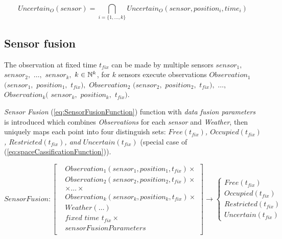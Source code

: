     \begin{equation}\label{eq:uncertainObservableSpaceForOneSensor}
         Uncertain_O(sensor)= \bigcap_{i=\{1,\dots,k\}}Uncertain_O(sensor,position_i,time_i)
    \end{equation}

\subsection{Sensor fusion}\label{s:SensorFusionDefinition}
    \noindent The observation at fixed time $t_{fix}$ can be made by multiple sensors $sensor_1,$ $sensor_2,$ $\dots,$ $sensor_k,$ $k\in\mathbb{N}^k$, for $k$ sensors execute observations $Observation_1$ $(sensor_1,$ $position_1,$ $t_{fix}),$ $Observation_2$ $(sensor_2,$ $position_2,$ $t_{fix}),$ $\dots,$ $Observation_k($ $sensor_k,$ $position_k,$ $t_{fix})$. 

    \emph{Sensor Fusion} (\ref{eq:SensorFusionFunction}) function with \emph{data fusion parameters} is introduced which combines \emph{Observations} for each \emph{sensor} and \emph{Weather}, then  uniquely maps each point into four distinguish sets: \emph{$Free(t_{fix})$, $Occupied(t_{fix})$, $Restricted(t_{fix})$, and $Uncertain(t_{fix})$} (special case of (\ref{eq:spaceCassificationFunction})).

    \begin{equation}\label{eq:SensorFusionFunction}
        SensorFusion:
        \left[
        \begin{aligned}
            &Observation_1 (sensor_1, position_1, t_{fix})\times\\
            &Observation_2 (sensor_2, position_2, t_{fix})\times\\
            &\times\dots\times\\
            &Observation_k (sensor_k, position_k, t_{fix})\times\\
            &Weather(\dots)\\
            &\textit{fixed time }t_{fix}\times\\
            &sensorFusionParameters\\
        \end{aligned}
        \right]
        \to
        \begin{cases}
            Free(t_{fix})\\
            Occupied(t_{fix})\\
            Restricted(t_{fix})\\
            Uncertain(t_{fix})
        \end{cases}
    \end{equation}

